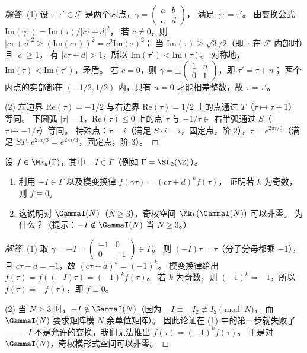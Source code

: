 \begin{proof}[解答]
(1) 设 $\tau, \tau' \in \mathcal{F}$ 是两个内点，$\gamma = \begin{pmatrix}a&b\\c&d\end{pmatrix}$，
满足 $\gamma\tau = \tau'$。
由变换公式 $\mathrm{Im}(\gamma\tau) = \mathrm{Im}(\tau)/|c\tau+d|^2$，
若 $c \neq 0$，则 $|c\tau+d|^2 \geq (\mathrm{Im}(c\tau))^2 = c^2 \mathrm{Im}(\tau)^2$；
当 $\mathrm{Im}(\tau) \geq \sqrt{3}/2$（即 $\tau$ 在 $\mathcal{F}$ 内部时）且 $|c| \geq 1$，
有 $|c\tau+d| > 1$，所以 $\mathrm{Im}(\tau') < \mathrm{Im}(\tau)$。
对称地，$\mathrm{Im}(\tau) < \mathrm{Im}(\tau')$，矛盾。
若 $c = 0$，则 $\gamma = \pm\begin{pmatrix}1&n\\0&1\end{pmatrix}$，即 $\tau' = \tau+n$；
两个内点的实部都在 $(-1/2,1/2)$ 内，只有 $n = 0$ 才能相差整数，故 $\tau = \tau'$。

(2) 左边界 $\mathrm{Re}(\tau) = -1/2$ 与右边界 $\mathrm{Re}(\tau) = 1/2$ 上的点通过 $T$（$\tau \mapsto \tau+1$）等同。
下圆弧 $|\tau| = 1$，$\mathrm{Re}(\tau) \leq 0$ 上的点 $\tau$ 与 $-1/\tau \in$ 右半弧通过 $S$（$\tau \mapsto -1/\tau$）等同。
特殊点：$\tau = i$（满足 $S \cdot i = i$，固定点，阶 $2$），$\tau = e^{2\pi i/3}$（满足 $ST \cdot e^{2\pi i/3} = e^{2\pi i/3}$，固定点，阶 $3$）。
\end{proof}

\begin{exercise}
\label{ex:ch1-weight-odd}
设 $f \in \Mk_k(\Gamma)$，其中 $-I \in \Gamma$（例如 $\Gamma = \SL_2(\Z)$）。
\begin{enumerate}
  \item[(1)] 利用 $-I \in \Gamma$ 以及模变换律 $f(\gamma\tau) = (c\tau+d)^k f(\tau)$，
    证明若 $k$ 为奇数，则 $f \equiv 0$。
  \item[(2)] 这说明对 $\GammaI(N)$（$N \geq 3$），奇权空间 $\Mk_k(\GammaI(N))$ 可以非零。
    为什么？（提示：$-I \notin \GammaI(N)$ 当 $N \geq 3$。）
\end{enumerate}
\end{exercise}

\begin{proof}[解答]
(1) 取 $\gamma = -I = \begin{pmatrix}-1&0\\0&-1\end{pmatrix} \in \Gamma$。
则 $(-I)\tau = \tau$（分子分母都乘 $-1$），且 $c\tau+d = -1$，故
$(c\tau+d)^k = (-1)^k$。
模变换律给出 $f(\tau) = f((-I)\tau) = (-1)^k f(\tau)$。
若 $k$ 为奇数，则 $(-1)^k = -1$，所以 $f(\tau) = -f(\tau)$，即 $f \equiv 0$。

(2) 当 $N \geq 3$ 时，$-I \notin \GammaI(N)$（因为 $-I \equiv -I_2 \not\equiv I_2 \pmod{N}$，
而 $\GammaI(N)$ 要求矩阵模 $N$ 余单位矩阵）。
因此论证在 (1) 中的第一步就失败了——$-I$ 不是允许的变换，我们无法推出 $f(\tau) = (-1)^k f(\tau)$。
于是对 $\GammaI(N)$，奇权模形式空间可以非零。
\end{proof}

